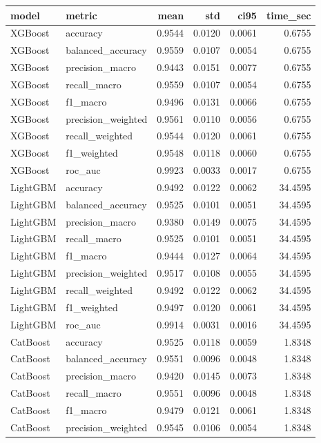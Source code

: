 \begin{tabular}{llrrrr}
\toprule
model & metric & mean & std & ci95 & time_sec \\
\midrule
XGBoost & accuracy & 0.9544 & 0.0120 & 0.0061 & 0.6755 \\
XGBoost & balanced_accuracy & 0.9559 & 0.0107 & 0.0054 & 0.6755 \\
XGBoost & precision_macro & 0.9443 & 0.0151 & 0.0077 & 0.6755 \\
XGBoost & recall_macro & 0.9559 & 0.0107 & 0.0054 & 0.6755 \\
XGBoost & f1_macro & 0.9496 & 0.0131 & 0.0066 & 0.6755 \\
XGBoost & precision_weighted & 0.9561 & 0.0110 & 0.0056 & 0.6755 \\
XGBoost & recall_weighted & 0.9544 & 0.0120 & 0.0061 & 0.6755 \\
XGBoost & f1_weighted & 0.9548 & 0.0118 & 0.0060 & 0.6755 \\
XGBoost & roc_auc & 0.9923 & 0.0033 & 0.0017 & 0.6755 \\
LightGBM & accuracy & 0.9492 & 0.0122 & 0.0062 & 34.4595 \\
LightGBM & balanced_accuracy & 0.9525 & 0.0101 & 0.0051 & 34.4595 \\
LightGBM & precision_macro & 0.9380 & 0.0149 & 0.0075 & 34.4595 \\
LightGBM & recall_macro & 0.9525 & 0.0101 & 0.0051 & 34.4595 \\
LightGBM & f1_macro & 0.9444 & 0.0127 & 0.0064 & 34.4595 \\
LightGBM & precision_weighted & 0.9517 & 0.0108 & 0.0055 & 34.4595 \\
LightGBM & recall_weighted & 0.9492 & 0.0122 & 0.0062 & 34.4595 \\
LightGBM & f1_weighted & 0.9497 & 0.0120 & 0.0061 & 34.4595 \\
LightGBM & roc_auc & 0.9914 & 0.0031 & 0.0016 & 34.4595 \\
CatBoost & accuracy & 0.9525 & 0.0118 & 0.0059 & 1.8348 \\
CatBoost & balanced_accuracy & 0.9551 & 0.0096 & 0.0048 & 1.8348 \\
CatBoost & precision_macro & 0.9420 & 0.0145 & 0.0073 & 1.8348 \\
CatBoost & recall_macro & 0.9551 & 0.0096 & 0.0048 & 1.8348 \\
CatBoost & f1_macro & 0.9479 & 0.0121 & 0.0061 & 1.8348 \\
CatBoost & precision_weighted & 0.9545 & 0.0106 & 0.0054 & 1.8348 \\

\end{tabular}
